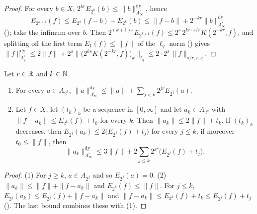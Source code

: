 \begin{proof}
\leanok
For every $b \in X$, $2^{kr} E_{2^k}(b) \leq \|b\|^{\mathrm{dy}}_{A^r_\infty}$, hence
\[
  E_{2^{k+1}}(f) \leq E_{2^k}(f - b) + E_{2^k}(b)
  \leq \|f - b\| + 2^{-kr} \|b\|^{\mathrm{dy}}_{A^r_\infty}
\]
(); take the infimum over $b$. Then
$2^{(k+1)s} E_{2^{k+1}}(f) \leq 2^s \, 2^{kr \cdot s/r} K(2^{-kr}, f)$, and splitting off the
first term $E_1(f) \leq \|f\|$ of the $\ell_q$ norm () gives
$\|f\|^{\mathrm{dy}}_{A^s_q} \leq 2 \|f\| + 2^s \bigl\| \bigl(2^{ks} K(2^{-kr}, f)\bigr)_k
\bigr\|_{\ell_q} \leq 2 \cdot 2^s \, \|f\|_{s/r, r, q}$.
\end{proof}

\begin{lemma}
\label{lem:approximants-top-norm}
\leanok
{}
Let $r \in \mathbb{R}$ and $k \in \mathbb{N}$.
\begin{enumerate}
  \item For every $a \in A_{2^k}$,
    $\|a\|^{\mathrm{dy}}_{A^r_\infty} \leq \|a\| + \sum_{j<k} 2^{jr} E_{2^j}(a)$.
  \item Let $f \in X$, let $(t_k)_k$ be a sequence in $[0, \infty]$ and let $a_k \in A_{2^k}$
    with $\|f - a_k\| \leq E_{2^k}(f) + t_k$ for every $k$. Then
    $\|a_k\| \leq 2 \|f\| + t_k$. If $(t_k)_k$ decreases, then
    $E_{2^j}(a_k) \leq 2 \bigl(E_{2^j}(f) + t_j\bigr)$ for every $j \leq k$; if moreover
    $t_0 \leq \|f\|$, then
    \[
      \|a_k\|^{\mathrm{dy}}_{A^r_\infty}
      \leq 3 \|f\| + 2 \sum_{j \leq k} 2^{jr} \bigl(E_{2^j}(f) + t_j\bigr) .
    \]
\end{enumerate}
\end{lemma}

\begin{proof}
\leanok
(1) For $j \geq k$, $a \in A_{2^j}$ and so $E_{2^j}(a) = 0$. (2) $\|a_k\| \leq \|f\| +
\|f - a_k\|$ and $E_{2^k}(f) \leq \|f\|$. For $j \leq k$,
$E_{2^j}(a_k) \leq E_{2^j}(f) + \|f - a_k\|$ and
$\|f - a_k\| \leq E_{2^k}(f) + t_k \leq E_{2^j}(f) + t_j$ (). The last
bound combines these with (1).
\end{proof}

